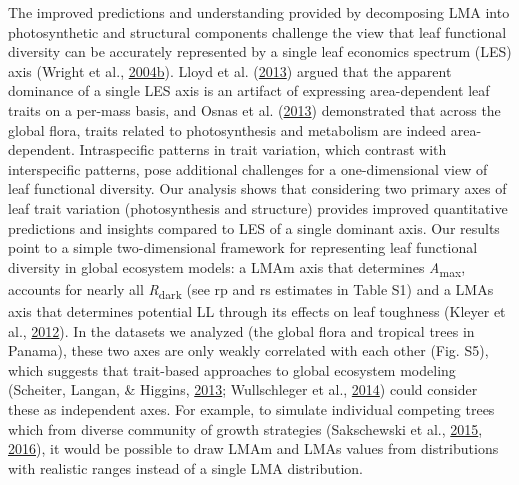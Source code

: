 \documentclass[12pt,]{article}
\theoremstyle{definition}
\theoremstyle{definition}
\theoremstyle{definition}
\theoremstyle{remark}
\begin{document}
The improved predictions and understanding provided by decomposing LMA
into photosynthetic and structural components challenge the view that
leaf functional diversity can be accurately represented by a single leaf
economics spectrum (LES) axis (Wright et al.,
\protect\hyperlink{ref-Wright2004}{2004}\protect\hyperlink{ref-Wright2004}{b}).
Lloyd et al. (\protect\hyperlink{ref-Lloyd2013}{2013}) argued that the
apparent dominance of a single LES axis is an artifact of expressing
area-dependent leaf traits on a per-mass basis, and Osnas et al.
(\protect\hyperlink{ref-Osnas2013}{2013}) demonstrated that across the
global flora, traits related to photosynthesis and metabolism are indeed
area-dependent. Intraspecific patterns in trait variation, which
contrast with interspecific patterns, pose additional challenges for a
one-dimensional view of leaf functional diversity. Our analysis shows
that considering two primary axes of leaf trait variation
(photosynthesis and structure) provides improved quantitative
predictions and insights compared to LES of a single dominant axis. Our
results point to a simple two-dimensional framework for representing
leaf functional diversity in global ecosystem models: a LMAm axis that
determines \emph{A}\textsubscript{max}, accounts for nearly all
\emph{R}\textsubscript{dark} (see rp and rs estimates in Table S1) and a
LMAs axis that determines potential LL through its effects on leaf
toughness (Kleyer et al., \protect\hyperlink{ref-Kleyer2012}{2012}). In
the datasets we analyzed (the global flora and tropical trees in
Panama), these two axes are only weakly correlated with each other (Fig.
S5), which suggests that trait-based approaches to global ecosystem
modeling (Scheiter, Langan, \& Higgins,
\protect\hyperlink{ref-Scheiter2013}{2013}; Wullschleger et al.,
\protect\hyperlink{ref-Wullschleger2014}{2014}) could consider these as
independent axes. For example, to simulate individual competing trees
which from diverse community of growth strategies (Sakschewski et al.,
\protect\hyperlink{ref-Sakschewski2015}{2015},
\protect\hyperlink{ref-Sakschewski2016}{2016}), it would be possible to
draw LMAm and LMAs values from distributions with realistic ranges
instead of a single LMA distribution.
\end{document}

